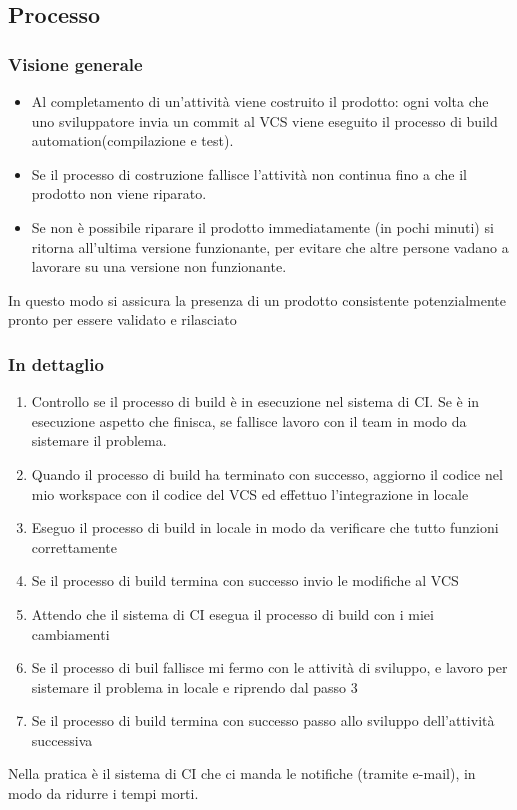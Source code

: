 \documentclass[10pt, a4paper]{article}
\begin{document}
\subsection{Processo}
\subsubsection{Visione generale}
\begin{itemize}
    \item Al completamento di un'attività viene costruito il prodotto: ogni volta che uno sviluppatore invia un commit al VCS viene eseguito il processo di build automation(compilazione e test).
    \item Se il processo di costruzione fallisce l'attività non continua fino a che il prodotto non viene riparato.
    \item Se non è possibile riparare il prodotto immediatamente (in pochi minuti) si ritorna all'ultima versione funzionante, per evitare che altre persone vadano a lavorare su una versione non funzionante.
\end{itemize}
In questo modo si assicura la presenza di un prodotto consistente potenzialmente pronto per essere validato e rilasciato

\subsubsection{In dettaglio}
\begin{enumerate}
    \item Controllo se il processo di build è in esecuzione nel sistema di CI. Se è in esecuzione aspetto che finisca, se fallisce lavoro con il team in modo da sistemare il problema.
    \item Quando il processo di build ha terminato con successo, aggiorno il codice nel mio workspace con il codice del VCS ed effettuo l’integrazione in locale
    \item Eseguo il processo di build in locale in modo da verificare che tutto funzioni correttamente
    \item Se il processo di build termina con successo invio le modifiche al VCS
    \item Attendo che il sistema di CI esegua il processo di build con i miei cambiamenti
    \item Se il processo di buil fallisce mi fermo con le attività di sviluppo, e lavoro per sistemare il problema in locale e riprendo dal passo 3
    \item Se il processo di build termina con successo passo allo sviluppo dell’attività successiva
\end{enumerate}
Nella pratica è il sistema di CI che ci manda le notifiche (tramite e-mail), in modo da ridurre i tempi morti.
\end{document}
